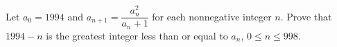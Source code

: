 Let $a_0 = 1994$ and $a_{n+1} = \dfrac{a_n^2}{a_n+1}$ for each nonnegative integer $n$. Prove that $1994 - n$ is the greatest integer less than or equal to $a_n$, $0 \le n \le 998$.
